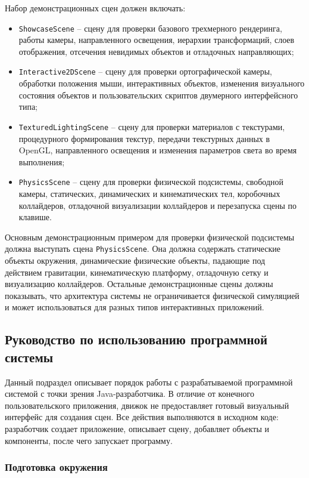 Набор демонстрационных сцен должен включать:
\begin{itemize}
\item \texttt{ShowcaseScene} -- сцену для проверки базового трехмерного рендеринга, работы камеры, направленного освещения, иерархии трансформаций, слоев отображения, отсечения невидимых объектов и отладочных направляющих;
\item \texttt{Interactive2DScene} -- сцену для проверки ортографической камеры, обработки положения мыши, интерактивных объектов, изменения визуального состояния объектов и пользовательских скриптов двумерного интерфейсного типа;
\item \texttt{TexturedLightingScene} -- сцену для проверки материалов с текстурами, процедурного формирования текстур, передачи текстурных данных в OpenGL, направленного освещения и изменения параметров света во время выполнения;
\item \texttt{PhysicsScene} -- сцену для проверки физической подсистемы, свободной камеры, статических, динамических и кинематических тел, коробочных коллайдеров, отладочной визуализации коллайдеров и перезапуска сцены по клавише.
\end{itemize}

Основным демонстрационным примером для проверки физической подсистемы должна выступать сцена \texttt{PhysicsScene}. Она должна содержать статические объекты окружения, динамические физические объекты, падающие под действием гравитации, кинематическую платформу, отладочную сетку и визуализацию коллайдеров. Остальные демонстрационные сцены должны показывать, что архитектура системы не ограничивается физической симуляцией и может использоваться для разных типов интерактивных приложений.

\subsection{Руководство по использованию программной системы}

Данный подраздел описывает порядок работы с разрабатываемой программной системой с точки зрения Java-разработчика. В отличие от конечного пользовательского приложения, движок не предоставляет готовый визуальный интерфейс для создания сцен. Все действия выполняются в исходном коде: разработчик создает приложение, описывает сцену, добавляет объекты и компоненты, после чего запускает программу.

\subsubsection{Подготовка окружения}

